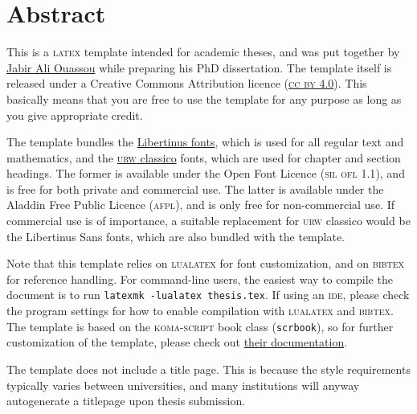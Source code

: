 \chapter*{Abstract}\noindent
This is a \textsc{latex} template intended for academic theses, and was put together by \href{https://github.com/jabirali}{Jabir Ali Ouassou} while preparing his PhD dissertation.
The template itself is released under a Creative Commons Attribution licence (\href{https://creativecommons.org/licenses/by/4.0/}{\textsc{cc by 4.0}}).
This basically means that you are free to use the template for any purpose as long as you give appropriate credit.

The template bundles the \href{https://github.com/libertinus-fonts/libertinus}{Libertinus fonts}, which is used for all regular text and mathematics, and the \href{https://ctan.org/tex-archive/fonts/urw/classico}{\textsc{urw} classico} fonts, which are used for chapter and section headings.
The former is available under the Open Font Licence (\textsc{sil ofl 1.1}), and is free for both private and commercial use.
The latter is available under the Aladdin Free Public Licence (\textsc{afpl}), and is only free for non-commercial use.
If commercial use is of importance, a suitable replacement for \textsc{urw} classico would be the Libertinus Sans fonts, which are also bundled with the template.

Note that this template relies on \textsc{lualatex} for \eg font customization, and on \textsc{bibtex} for reference handling.
For command-line users, the easiest way to compile the document is to run \texttt{latexmk -lualatex thesis.tex}.
If using an \textsc{ide}, please check the program settings for how to enable compilation with \textsc{lualatex} and \textsc{bibtex}.
The template is based on the \textsc{koma-script} book class (\texttt{scrbook}), so for further customization of the template, please check out \href{https://ctan.org/pkg/koma-script}{their documentation}.

The template does not include a title page.
This is because the style requirements typically varies between universities, and many institutions will anyway autogenerate a titlepage upon thesis submission.
